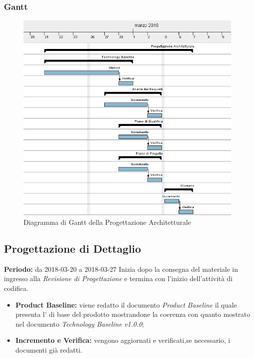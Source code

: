 \subsubsection{Gantt}
\begin{figure}[H]
	\centering 
	\includegraphics[width=1\textwidth]{images/Progettazione-Architetturale.png}
	\caption{Diagramma di Gantt della Progettazione Architetturale}
	\label{graficobello3} 
\end{figure}
\subsection{Progettazione di Dettaglio}
    \textbf{Periodo:} da 2018-03-20 a 2018-03-27\Spazio
    Inizia dopo la consegna del materiale in ingresso alla \emph{Revisione di Progettazione} e termina con l'inizio dell'attività di codifica.
    \begin{itemize}
    	\item \textbf{Product Baseline:} viene redatto il documento \emph{Product Baseline} il quale presenta l' di base del prodotto mostrandone la coerenza con quanto mostrato nel documento \emph{Technology Baseline v1.0.0};
    	\item \textbf{Incremento e Verifica:} vengono aggiornati e verificati,se necessario, i documenti già redatti.
    \end{itemize}
